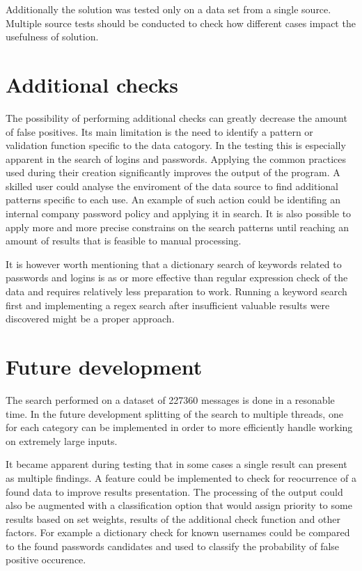 \documentclass[a4paper,twoside,12pt]{book}
\begin{document}
Additionally the solution was tested only on a data set from a single source. Multiple source 
tests should be conducted to check how different cases impact the usefulness of solution. 

\section{Additional checks}

The possibility of performing additional checks can greatly decrease the amount of false positives.
Its main limitation is the need to identify a pattern or validation function specific to the data catogory.
In the testing this is especially apparent in the search of logins and passwords. Applying the common practices 
used during their creation significantly improves the output of the program. 
A skilled user could analyse the enviroment of the data source to find additional patterns specific to each use.
An example of such action could be identifing an internal company password policy and applying it in search.
It is also possible to apply more and more precise constrains on the search patterns until reaching an amount of 
results that is feasible to manual processing. 

It is however worth mentioning that a dictionary search of keywords related to passwords and
logins is as or more effective than regular expression check of the data and requires relatively
less preparation to work. Running a keyword search first and implementing a regex search after 
insufficient valuable results were discovered might be a proper approach.

\section{Future development}

The search performed on a dataset of 227360 messages is done in a resonable time. In the future development
splitting of the search to multiple threads, one for each category can be implemented in order to more efficiently
handle working on extremely large inputs. 

It became apparent during testing that in some cases a single result can present as multiple findings. 
A feature could be implemented to check for reocurrence of a found data to improve
results presentation. The processing of the output could also be augmented with a classification
option that would assign priority to some results based on set weights, results of the additional
check function and other factors. For example a dictionary check for known usernames could be compared to
the found passwords candidates and used to classify the probability of false positive occurence. 
\end{document}
